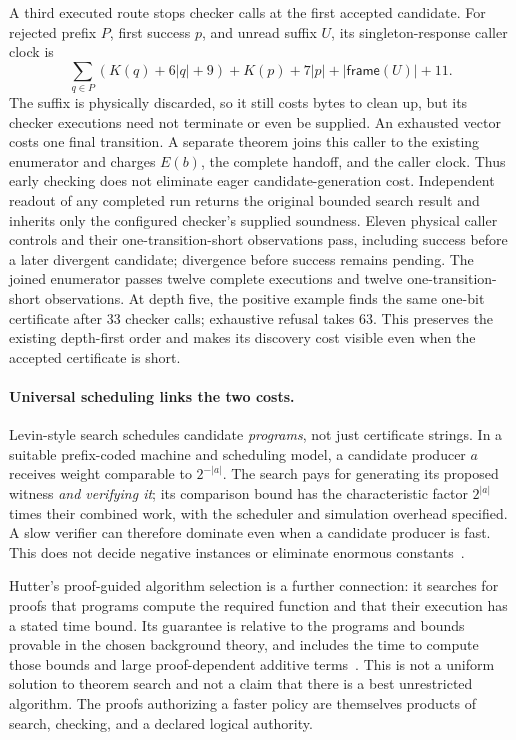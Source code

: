 \documentclass[11pt]{article}
\newcommand{\size}[1]{\lvert #1\rvert}
\begin{document}
A third executed route stops checker calls at the first accepted candidate.
For rejected prefix $P$, first success $p$, and unread suffix $U$, its
singleton-response caller clock is
\[
 \sum_{q\in P}(K(q)+6\size q+9)
 +K(p)+7\size p+\size{\mathsf{frame}(U)}+11.
\]
The suffix is physically discarded, so it still costs bytes to clean up,
but its checker executions need not terminate or even be supplied.
An exhausted vector costs one final transition. A separate theorem joins
this caller to the existing enumerator and charges $E(b)$, the complete
handoff, and the caller clock. Thus early checking does not eliminate eager
candidate-generation cost. Independent readout of any completed run returns
the original bounded search result and inherits only the configured
checker's supplied soundness. Eleven physical caller controls and their
one-transition-short observations pass, including success before a
later divergent candidate; divergence before success remains pending.
The joined enumerator passes twelve complete executions and twelve
one-transition-short observations. At depth five, the positive example
finds the same one-bit certificate after 33 checker calls; exhaustive
refusal takes 63. This preserves the existing depth-first order and makes
its discovery cost visible even when the accepted certificate is short.

\paragraph{Universal scheduling links the two costs.}
Levin-style search schedules candidate \emph{programs}, not just
certificate strings. In a suitable prefix-coded machine and scheduling
model, a candidate producer $a$ receives weight comparable to
$2^{-\size{a}}$. The search pays for generating its proposed witness
\emph{and verifying it}; its comparison bound has the characteristic
factor $2^{\size{a}}$ times their combined work, with the scheduler and
simulation overhead specified. A slow verifier can therefore dominate
even when a candidate producer is fast. This does not decide negative
instances or eliminate enormous constants~\cite{hutter}.

Hutter's proof-guided algorithm selection is a further connection:
it searches for proofs that programs compute the required function and
that their execution has a stated time bound. Its guarantee is relative
to the programs and bounds provable in the chosen background theory,
and includes the time to compute those bounds and large proof-dependent
additive terms~\cite{hutter}. This is not a uniform solution to theorem
search and not a claim that there is a best unrestricted algorithm.
The proofs authorizing a faster policy are themselves products of
search, checking, and a declared logical authority.
\end{document}
